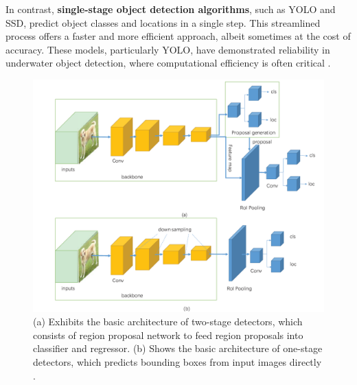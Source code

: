 In contrast, \textbf{single-stage object detection algorithms}, such as YOLO and SSD, predict object classes and locations in a single step. This streamlined process offers a faster and more efficient approach, albeit sometimes at the cost of accuracy. These models, particularly YOLO, have demonstrated reliability in underwater object detection, where computational efficiency is often critical \cite{lotfi2024comparison}.
\begin{figure}[ht]
    \centering
    \includegraphics[width=1\linewidth]{images/Object_detector_1stage_vs_2_stage.png}
    \caption{(a) Exhibits the basic architecture of two-stage detectors, which consists of region proposal network to feed region proposals into classifier and regressor. (b) Shows the basic architecture of one-stage detectors, which predicts bounding boxes from input images directly \cite{8825470}.}
    \label{fig:single-two-stage-object-detection}
\end{figure}

